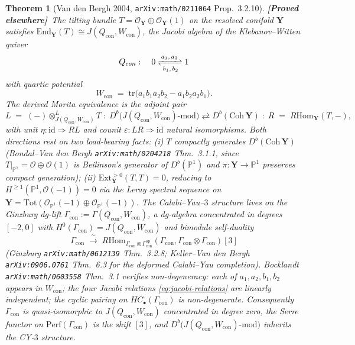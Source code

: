 \documentclass[11pt]{amsart}
\newtheorem{theorem}{Theorem}[section]
\theoremstyle{definition}
\providecommand{\bY}{\mathbf{Y}}
\providecommand{\cO}{\mathcal{O}}
\providecommand{\Hom}{\mathrm{Hom}}
\providecommand{\Ext}{\mathrm{Ext}}
\providecommand{\End}{\mathrm{End}}
\providecommand{\bP}{\mathbb{P}}
\providecommand{\ClaimStatusProvedElsewhere}{\textbf{\textsf{[Proved elsewhere]}}}
\begin{document}
\begin{theorem}[Van den Bergh 2004, \texttt{arXiv:math/0211064} Prop.~3.2.10]
\label{thm:vdb-nccr}
\ClaimStatusProvedElsewhere\
The tilting bundle $T = \cO_{\bY} \oplus \cO_{\bY}(1)$ on the resolved
conifold $\bY$ satisfies $\End_{\bY}(T) \cong J(Q_{\mathrm{con}}, W_{\mathrm{con}})$,
the Jacobi algebra of the Klebanov--Witten quiver
\[
  Q_{\mathrm{con}} : \quad 0 \xrightleftharpoons[\,b_1,\,b_2\,]{\,a_1,\,a_2\,} 1
\]
with quartic potential
\[
  W_{\mathrm{con}} \;=\; \mathrm{tr}\bigl(a_1 b_1 a_2 b_2 - a_1 b_2 a_2 b_1\bigr).
\]
The derived Morita equivalence is the adjoint pair
\[
  L \;=\; (-) \otimes^L_{J(Q_{\mathrm{con}}, W_{\mathrm{con}})} T
  \;:\; D^b\bigl(J(Q_{\mathrm{con}}, W_{\mathrm{con}})\text{-mod}\bigr)
  \rightleftarrows D^b(\mathrm{Coh}\,\bY)
  \;:\; R \;=\; R\Hom_{\bY}(T, -),
\]
with unit $\eta: \mathrm{id} \Rightarrow R L$ and counit
$\varepsilon: L R \Rightarrow \mathrm{id}$ natural isomorphisms.
Both directions rest on two load-bearing facts:
(i) $T$ compactly generates $D^b(\mathrm{Coh}\,\bY)$ (Bondal--Van den
Bergh \texttt{arXiv:math/0204218} Thm.~3.1.1, since $T|_{\bP^1} = \cO
\oplus \cO(1)$ is Beilinson's generator of $D^b(\bP^1)$ and $\pi: \bY
\to \bP^1$ preserves compact generation);
(ii) $\Ext^{>0}_{\bY}(T, T) = 0$, reducing to $H^{\geq 1}(\bP^1,
\cO(-1)) = 0$ via the Leray spectral sequence on $\bY = \mathrm{Tot}
(\cO_{\bP^1}(-1) \oplus \cO_{\bP^1}(-1))$.
The Calabi--Yau--$3$ structure lives on the Ginzburg dg-lift
$\Gamma_{\mathrm{con}} := \Gamma(Q_{\mathrm{con}}, W_{\mathrm{con}})$,
a dg-algebra concentrated in degrees $[-2, 0]$ with
$H^0(\Gamma_{\mathrm{con}}) = J(Q_{\mathrm{con}}, W_{\mathrm{con}})$
and bimodule self-duality
\[
  \Gamma_{\mathrm{con}} \;\xrightarrow{\;\sim\;}\;
  R\Hom_{\Gamma_{\mathrm{con}} \otimes \Gamma_{\mathrm{con}}^{\mathrm{op}}}
  (\Gamma_{\mathrm{con}}, \Gamma_{\mathrm{con}} \otimes
  \Gamma_{\mathrm{con}})[3]
\]
(Ginzburg \texttt{arXiv:math/0612139} Thm.~3.2.8;
Keller--Van den Bergh \texttt{arXiv:0906.0761} Thm.~6.3 for the
deformed Calabi--Yau completion). Bocklandt
\texttt{arXiv:math/0603558} Thm.~3.1 verifies non-degeneracy: each of
$a_1, a_2, b_1, b_2$ appears in $W_{\mathrm{con}}$; the four Jacobi
relations \eqref{eq:jacobi-relations} are linearly independent; the
cyclic pairing on $HC_\bullet(\Gamma_{\mathrm{con}})$ is
non-degenerate. Consequently $\Gamma_{\mathrm{con}}$ is
quasi-isomorphic to $J(Q_{\mathrm{con}}, W_{\mathrm{con}})$
concentrated in degree zero, the Serre functor on
$\mathrm{Perf}(\Gamma_{\mathrm{con}})$ is the shift $[3]$, and
$D^b\bigl(J(Q_{\mathrm{con}}, W_{\mathrm{con}})\text{-mod}\bigr)$
inherits the CY-$3$ structure.
\end{theorem}
\end{document}
